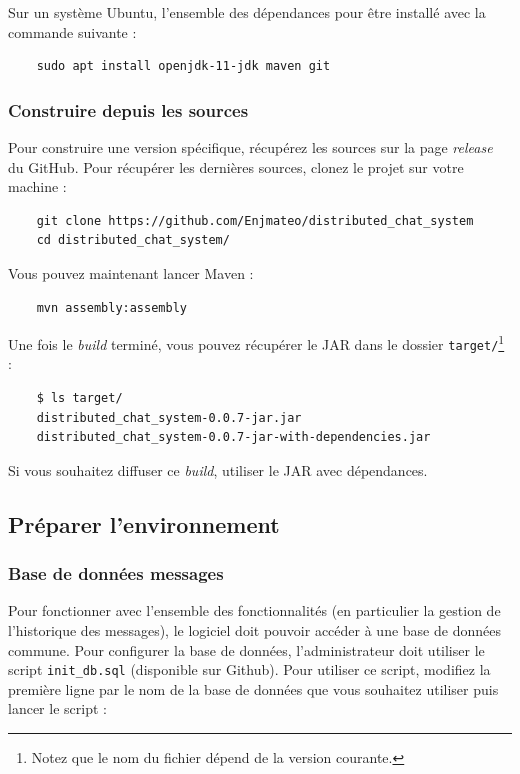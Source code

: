 \documentclass[12pt, a4paper]{article}
\begin{document}
    Sur un système Ubuntu, l'ensemble des dépendances pour être installé avec la commande suivante :
    \begin{verbatim}
    sudo apt install openjdk-11-jdk maven git
    \end{verbatim}
    \vspace{-10pt}
    
    \subsubsection{Construire depuis les sources}
    Pour construire une version spécifique, récupérez les sources sur la page \textit{release} du GitHub. Pour récupérer les dernières sources, clonez le projet sur votre machine :
    \begin{verbatim}
    git clone https://github.com/Enjmateo/distributed_chat_system
    cd distributed_chat_system/
    \end{verbatim}
    \vspace{-10pt}
    
    Vous pouvez maintenant lancer Maven :
    \begin{verbatim}
    mvn assembly:assembly
    \end{verbatim}
    \vspace{-10pt}
    
    Une fois le \textit{build} terminé, vous pouvez récupérer le JAR dans le dossier \texttt{target/}\footnote{Notez que le nom du fichier dépend de la version courante.} :
    \begin{verbatim}
    $ ls target/
    distributed_chat_system-0.0.7-jar.jar
    distributed_chat_system-0.0.7-jar-with-dependencies.jar
    \end{verbatim}
    \vspace{-10pt}
    
    Si vous souhaitez diffuser ce \textit{build}, utiliser le JAR avec dépendances.
    
    
    \subsection{Préparer l'environnement}
    \subsubsection{Base de données messages}
    Pour fonctionner avec l'ensemble des fonctionnalités (en particulier la gestion de l'historique des messages), le logiciel doit pouvoir accéder à une base de données commune. Pour configurer la base de données, l'administrateur doit utiliser le script \texttt{init\_db.sql} (disponible sur Github). Pour utiliser ce script, modifiez la première ligne par le nom de la base de données que vous souhaitez utiliser puis lancer le script :
    
\end{document}
